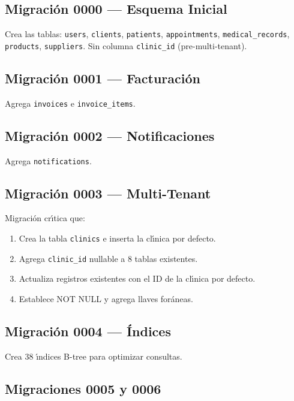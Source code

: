 \subsection{Migraci\'on 0000 --- Esquema Inicial}

Crea las tablas: \texttt{users}, \texttt{clients}, \texttt{patients},
\texttt{appointments}, \texttt{medical\_records}, \texttt{products},
\texttt{suppliers}. Sin columna \texttt{clinic\_id} (pre-multi-tenant).

\subsection{Migraci\'on 0001 --- Facturaci\'on}

Agrega \texttt{invoices} e \texttt{invoice\_items}.

\subsection{Migraci\'on 0002 --- Notificaciones}

Agrega \texttt{notifications}.

\subsection{Migraci\'on 0003 --- Multi-Tenant}

Migraci\'on cr\'{\i}tica que:

\begin{enumerate}
    \item Crea la tabla \texttt{clinics} e inserta la cl\'{\i}nica por defecto.
    \item Agrega \texttt{clinic\_id} nullable a 8 tablas existentes.
    \item Actualiza registros existentes con el ID de la cl\'{\i}nica por defecto.
    \item Establece NOT NULL y agrega llaves for\'aneas.
\end{enumerate}

\subsection{Migraci\'on 0004 --- \'Indices}

Crea 38 \'{\i}ndices B-tree para optimizar consultas.

\subsection{Migraciones 0005 y 0006}

